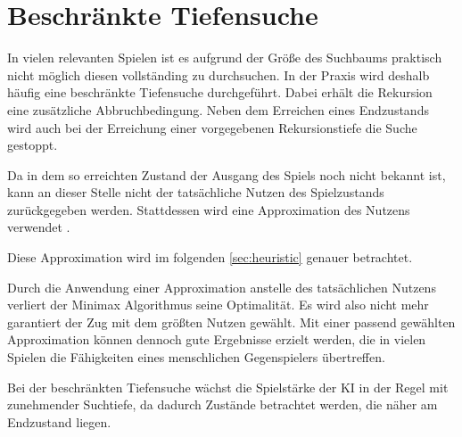 \section{Beschränkte Tiefensuche}

In vielen relevanten Spielen ist es aufgrund der Größe des Suchbaums praktisch nicht möglich diesen vollständing zu
durchsuchen. In der Praxis wird deshalb häufig eine beschränkte Tiefensuche durchgeführt. Dabei erhält die Rekursion
eine zusätzliche Abbruchbedingung. Neben dem Erreichen eines Endzustands wird auch bei der Erreichung einer
vorgegebenen Rekursionstiefe die Suche gestoppt.

Da in dem so erreichten Zustand der Ausgang des Spiels noch nicht bekannt ist, kann an dieser Stelle nicht der
tatsächliche Nutzen des Spielzustands zurückgegeben werden. Stattdessen wird eine Approximation des Nutzens verwendet \cite[S.~171]{ai2010russel}.

Diese Approximation wird im folgenden \autoref{sec:heuristic} genauer betrachtet.

Durch die Anwendung einer Approximation anstelle des tatsächlichen Nutzens verliert der Minimax Algorithmus seine
Optimalität. Es wird also nicht mehr garantiert der Zug mit dem größten Nutzen gewählt. Mit einer passend gewählten
Approximation können dennoch gute Ergebnisse erzielt werden, die in vielen Spielen die Fähigkeiten eines menschlichen
Gegenspielers übertreffen.

Bei der beschränkten Tiefensuche wächst die Spielstärke der \ac{KI} in der Regel mit zunehmender Suchtiefe, da dadurch
Zustände betrachtet werden, die näher am Endzustand liegen.
